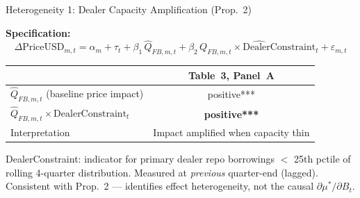 \documentclass[aspectratio=169, 10pt]{beamer}
\begin{document}
\begin{frame}{Heterogeneity 1: Dealer Capacity Amplification (Prop.~2)}

  \textbf{Specification:}
  \begin{equation*}
    \Delta\text{PriceUSD}_{m,t} = \alpha_m + \tau_t +
    \beta_1\,\hat{Q}_{FB,m,t} +
    \beta_2\,\widehat{Q_{FB,m,t} \times \text{DealerConstraint}_t} + \varepsilon_{m,t}
  \end{equation*}

  \bigskip

  \begin{center}
  \begin{tabular}{lc}
    \toprule
    & Table~3, Panel~A \\
    \midrule
    $\hat{Q}_{FB,m,t}$ (baseline price impact) & positive*** \\
    $\hat{Q}_{FB,m,t} \times \text{DealerConstraint}_t$ & {\color{resultcol}\textbf{positive***}} \\
    \midrule
    Interpretation & Impact amplified when capacity thin \\
    \bottomrule
  \end{tabular}
  \end{center}

  \bigskip

  {\color{dimgray}\small
    DealerConstraint: indicator for primary dealer repo borrowings $<$ 25th pctile
    of rolling 4-quarter distribution. Measured at \emph{previous} quarter-end (lagged).\\
    Consistent with Prop.~2 --- identifies effect heterogeneity, not the causal $\partial\mu^*/\partial B_t$.}

\end{frame}
\end{document}
